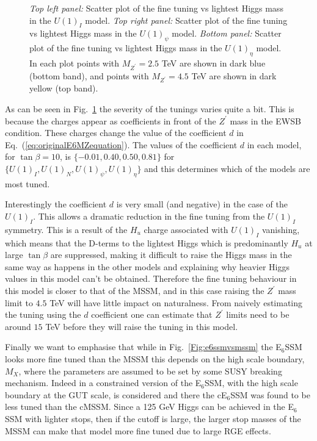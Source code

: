 \documentclass[preprint,amsmath,amssymb,aps,superscriptaddress,prd,
showpacs,floatfix,nofootinbib]{revtex4-1}
\begin{document}
\begin{figure}
\begin{center}
\caption{\textit{Top left panel:} Scatter plot of the fine tuning vs lightest
Higgs mass in the $U(1)_I$ model.  \textit{Top right panel:} Scatter plot of
the fine tuning vs lightest Higgs mass in the $U(1)_\psi$ model.
\textit{Bottom panel:} Scatter plot of the fine tuning vs lightest Higgs mass
in the $U(1)_\eta$ model.  In each plot points with $M_{Z^\prime} = 2.5$ TeV
are shown in dark blue (bottom band), and points with $M_{Z^\prime} = 4.5$
TeV are shown in dark yellow (top band).}
\label{Fig:othere6modelsvsmssm}
\end{center}
\end{figure}

As can be seen in Fig.~\ref{Fig:othere6modelsvsmssm} the severity of the
tunings varies quite a bit.  This is because the charges appear as
coefficients in front of the $Z^\prime$ mass in the EWSB condition.  These
charges change the value of the coefficient $d$ in
Eq.~(\ref{eq:originalE6MZequation}).  The values of the coefficient $d$ in
each model, for $\tan\beta = 10$, is $\{-0.01 , 0.40 , 0.50 , 0.81 \}$ for
$\{U(1)_I , U(1)_N , U(1)_\psi , U(1)_\eta \}$ and this determines which of
the models are most tuned.

Interestingly the coefficient $d$ is very small (and negative) in the
case of the $U(1)_I$.  This allows a dramatic reduction in the fine
tuning from the $U(1)_I$ symmetry.  This is a result of the $H_u$
charge associated with $U(1)_I$ vanishing, which means that the
D-terms to the lightest Higgs which is predominantly $H_u$ at large
$\tan\beta$ are suppressed, making it difficult to raise the Higgs
mass in the same way as happens in the other models and explaining why
heavier Higgs values in this model can't be obtained.  Therefore the
fine tuning behaviour in this model is closer to that of the MSSM, and
in this case raising the $Z^\prime$ mass limit to $4.5$ TeV will have
little impact on naturalness.  From naively estimating the tuning
using the $d$ coefficient one can estimate that $Z^\prime$ limits
need to be around $15$ TeV before they will raise the tuning in this
model.

Finally we want to emphasise that while in Fig.~\ref{Fig:e6ssmvsmssm}
the E$_6$SSM looks more fine tuned than the MSSM this depends on the
high scale boundary, $M_X$, where the parameters are assumed to be set
by some SUSY breaking mechanism.  Indeed in \cite{Athron:2013ipa} a
constrained version of the E$_6$SSM, with the high scale boundary at
the GUT scale, is considered and there the cE$_6$SSM was found to be
less tuned than the cMSSM.  Since a 125 GeV Higgs can be achieved in
the E$_6$SSM with lighter stops, then if the cutoff is large, the
larger stop masses of the MSSM can make that model more fine tuned due
to large RGE effects.
\end{document}
